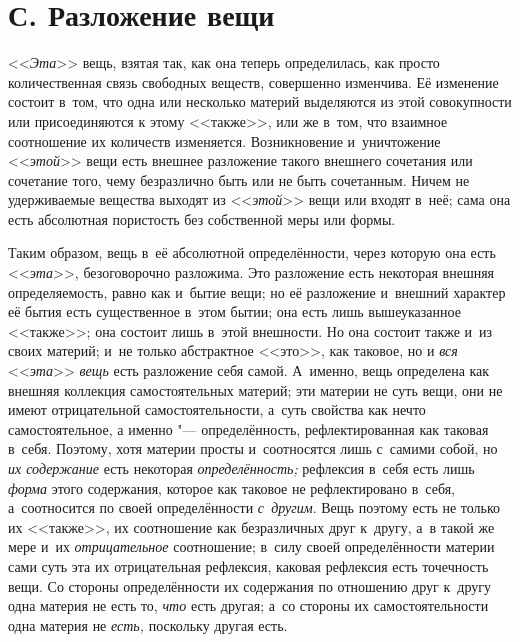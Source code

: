 \section[С. Разложение вещи]{С. Разложение вещи}

<<{\em Эта}>> вещь, взятая
так, как она теперь определилась, как просто количественная связь свободных
веществ, совершенно изменчива. Её изменение состоит в~том, что одна или
несколько материй выделяются из этой совокупности или присоединяются к
этому <<также>>, или же в~том, что взаимное соотношение их количеств
изменяется. Возникновение и~уничтожение <<{\em этой}>>
вещи есть внешнее разложение такого внешнего сочетания или сочетание того,
чему безразлично быть или не быть сочетанным. Ничем не удерживаемые
вещества выходят из <<{\em этой}>> вещи или входят в~неё;
сама она есть абсолютная пористость без собственной меры или формы.

Таким образом, вещь в~её абсолютной определённости, через которую она есть
<<{\em эта}>>, безоговорочно разложима. Это разложение
есть некоторая внешняя определяемость, равно как и~бытие вещи; но её
разложение и~внешний характер её бытия есть существенное в~этом бытии; она
есть лишь вышеуказанное <<также>>; она состоит лишь в~этой внешности. Но она
состоит также и~из своих материй; и~не только абстрактное <<это>>, как
таковое, но и {\em вся}
<<{\em эта}>> {\em вещь} есть
разложение себя самой. А~именно, вещь определена как внешняя коллекция
самостоятельных материй; эти материи не суть вещи, они не имеют
отрицательной самостоятельности, а~суть свойства как нечто самостоятельное,
а именно "--- определённость, рефлектированная как таковая в~себя. Поэтому,
хотя материи просты и~соотносятся лишь с~самими собой, но
{\em их содержание} есть некоторая
{\em определённость;} рефлексия в~себя есть лишь
{\em форма} этого содержания, которое как таковое не
рефлектировано в~себя, а~соотносится по своей определённости
{\em с~другим}. Вещь поэтому есть не только их <<также>>,
их соотношение как безразличных друг к~другу, а~в такой же мере и~их
{\em отрицательное} соотношение; в~силу своей
определённости материи сами суть эта их отрицательная рефлексия, каковая
рефлексия есть точечность вещи. Со стороны определённости их содержания по
отношению друг к~другу одна материя не есть то,
{\em что} есть другая; а~со стороны их
самостоятельности одна материя не {\em есть,} поскольку другая есть.

